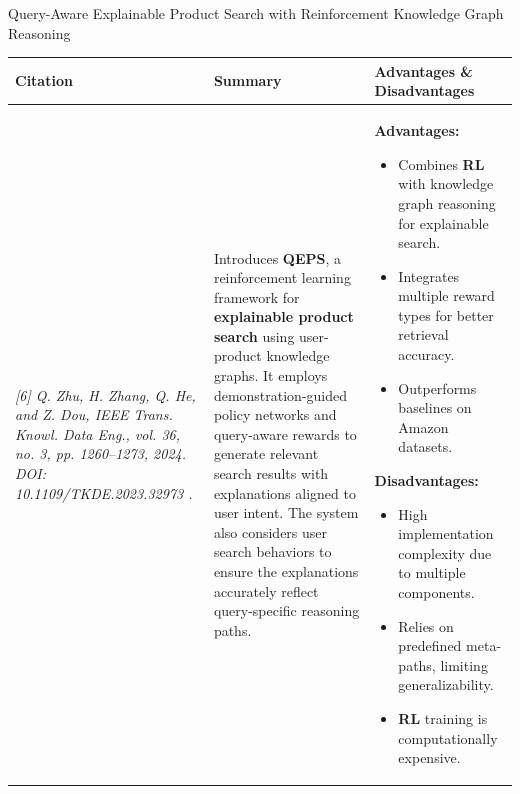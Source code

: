\begin{frame}{Query-Aware Explainable Product Search with Reinforcement Knowledge Graph Reasoning}
\scriptsize
\vspace{-0.8em}

\begin{table}[h!]
\centering
\renewcommand{\arraystretch}{1.5} %
\setlength{\tabcolsep}{2.5pt}     %

\begin{tabular}{|p{2.6cm}|p{4.3cm}|p{4.3cm}|}
\hline
\textbf{Citation} & \textbf{Summary} & \textbf{Advantages \& Disadvantages} \\
\hline
\tiny\textit{[6] Q. Zhu, H. Zhang, Q. He, and Z. Dou, IEEE Trans. Knowl. Data Eng., vol. 36, no. 3, pp. 1260–1273, 2024.  
DOI: 10.1109/TKDE.2023.32973
\newline 31.}
&
Introduces \textbf{QEPS}, a reinforcement learning framework for \textbf{explainable product search} using user-product knowledge graphs. It employs demonstration-guided policy networks and query-aware rewards to generate relevant search results with explanations aligned to user intent. The system also considers user search behaviors to ensure the explanations accurately reflect query-specific reasoning paths.
&
\textbf{Advantages:}
\begin{itemize}\itemsep0.25em
\item Combines \textbf{RL} with knowledge graph reasoning for explainable search.
\item Integrates multiple reward types for better retrieval accuracy.
\item Outperforms baselines on Amazon datasets.
\end{itemize}

\textbf{Disadvantages:}
\begin{itemize}\itemsep0.25em
\item High implementation complexity due to multiple components.
\item Relies on predefined meta-paths, limiting generalizability.
\item \textbf{RL} training is computationally expensive.
\end{itemize} \\
\hline
\end{tabular}
\end{table}
\end{frame}
